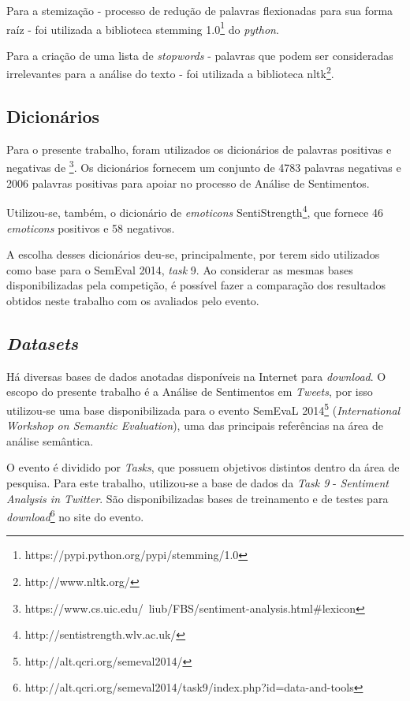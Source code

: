\documentclass[12pt]{article}
\begin{document}
Para a stemização - processo de redução de palavras flexionadas para sua forma raíz - foi utilizada a biblioteca stemming 1.0\footnote{https://pypi.python.org/pypi/stemming/1.0} do \emph{python}.

Para a criação de uma lista de \emph{stopwords} - palavras que podem ser consideradas irrelevantes para a análise do texto - foi utilizada a biblioteca nltk\footnote{http://www.nltk.org/}.

\subsection{Dicionários}

Para o presente trabalho, foram utilizados os dicionários de palavras positivas e negativas de \cite{HuAndLiu2004}\footnote{https://www.cs.uic.edu/~liub/FBS/sentiment-analysis.html\#lexicon}. Os dicionários fornecem um conjunto de 4783 palavras negativas e 2006 palavras positivas para apoiar no processo de Análise de Sentimentos.

Utilizou-se, também, o dicionário de \emph{emoticons} SentiStrength\footnote{http://sentistrength.wlv.ac.uk/}, que fornece 46 \emph{emoticons} positivos e 58 negativos.

A escolha desses dicionários deu-se, principalmente, por terem sido utilizados como base para o SemEval 2014, \emph{task} 9. Ao considerar as mesmas bases disponibilizadas pela competição, é possível fazer a comparação dos resultados obtidos neste trabalho com os avaliados pelo evento.

\subsection{\emph{Datasets}}
\label{datasets}
Há diversas bases de dados anotadas disponíveis na Internet para \emph{download}. O escopo do presente trabalho é a Análise de Sentimentos em \emph{Tweets}, por isso utilizou-se uma base disponibilizada para o evento SemEvaL 2014\footnote{http://alt.qcri.org/semeval2014/} (\emph{International Workshop on Semantic Evaluation}), uma das principais referências na área de análise semântica.  

O evento é dividido por \emph{Tasks}, que possuem objetivos distintos dentro da área de pesquisa. Para este trabalho, utilizou-se a base de dados da \emph{Task 9} - \emph{Sentiment Analysis in Twitter}. São disponibilizadas bases de treinamento e de testes para \emph{download}\footnote{http://alt.qcri.org/semeval2014/task9/index.php?id=data-and-tools} no site do evento.
\end{document}
